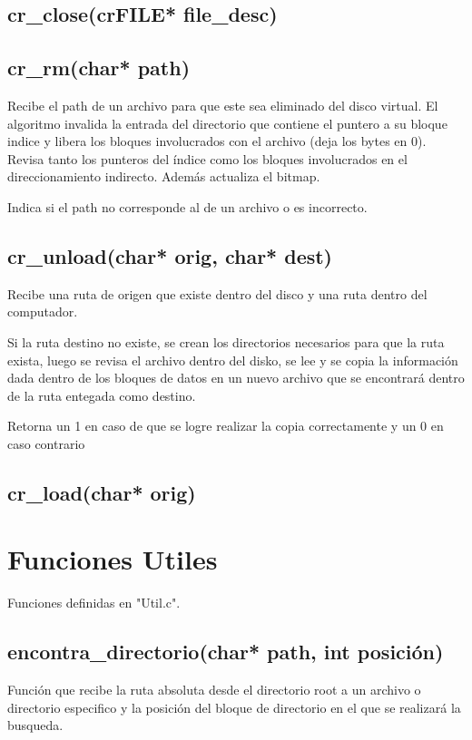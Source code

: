 \documentclass[12pt]{article}
\begin{document}
\subsection{cr\_close(crFILE* file\_desc)}

\subsection{cr\_rm(char* path)}
Recibe el path de un archivo para que este sea eliminado del disco virtual. El algoritmo invalida la entrada del directorio que contiene el puntero a su bloque indice y libera los bloques involucrados con el archivo (deja los bytes en 0). Revisa tanto los punteros del índice como los bloques involucrados en el direccionamiento indirecto. Además actualiza el bitmap.

Indica si el path no corresponde al de un archivo o es incorrecto.

\subsection{cr\_unload(char* orig, char* dest)}
Recibe una ruta de origen que existe dentro del disco y una ruta dentro del computador.

Si la ruta destino no existe, se crean los directorios necesarios para que la ruta exista, luego se revisa el archivo dentro del disko, se lee y se copia la información dada dentro de los bloques de datos en un nuevo archivo que se encontrará dentro de la ruta entegada como destino.

Retorna un 1 en caso de que se logre realizar la copia correctamente y un 0 en caso contrario
\subsection{cr\_load(char* orig)}

\section{Funciones Utiles}
Funciones definidas en "Util.c".

\subsection{encontra\_directorio(char* path, int posición)}
Función que recibe la ruta absoluta desde el directorio root a un archivo o directorio especifico y la posición del bloque de directorio en el que se realizará la busqueda. 
\end{document}
